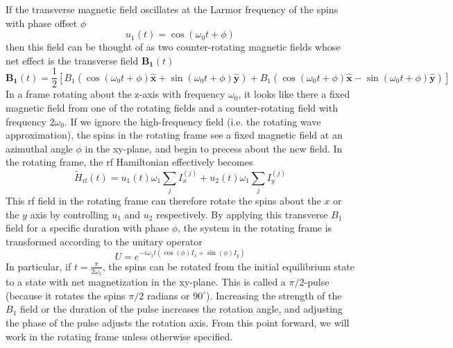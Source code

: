 If the transverse magnetic field oscillates at the Larmor frequency of the spins with phase offset $\phi$
\[
u_1(t) = \cos(\omega_0 t + \phi)
\]
then this field can be thought of as two counter-rotating magnetic fields whose net effect is the transverse field $\mathbf{B_1}(t)$
\[
\mathbf{B_1}(t) = \frac{1}{2} \left[
    B_1 (\cos(\omega_0 t + \phi) \mathbf{\hat{x}} + \sin(\omega_0 t + \phi) \mathbf{\hat{y}}) +
    B_1 (\cos(\omega_0 t + \phi) \mathbf{\hat{x}} - \sin(\omega_0 t + \phi) \mathbf{\hat{y}})
\right]
\]
%
%
In a frame rotating about the z-axis with frequency $\omega_0$, it looks like there a fixed magnetic field from one of the rotating fields and a counter-rotating field with frequency $2\omega_0$. If we ignore the high-frequency field (i.e. the rotating wave approximation), the spins in the rotating frame see a fixed magnetic field at an azimuthal angle $\phi$ in the xy-plane, and begin to precess about the new field.
In the rotating frame, the rf Hamiltonian effectively becomes
\begin{equation}\label{eq:nmr-ham-rf-rotating}
    \widetilde{H}_\text{rf}(t) = u_1(t) \omega_1 \sum_j I_x^{(j)} + u_2(t) \omega_1 \sum_j I_y^{(j)}
\end{equation}
This rf field in the rotating frame can therefore rotate the spins about the $x$ or the $y$ axis by controlling $u_1$ and $u_2$ respectively.
By applying this transverse $B_1$ field for a specific duration with phase $\phi$, the system in the rotating frame is transformed according to the unitary operator
\[
U = e^{-i \omega_1 t (\cos(\phi) I_x + \sin(\phi) I_y)}
\]
In particular, if $t = \frac{\pi}{2 \omega_1}$, the spins can be rotated from the initial equilibrium state to a state with net magnetization in the xy-plane. This is called a $\pi/2$-pulse (because it rotates the spins $\pi/2$ radians or $90^\circ$). Increasing the strength of the $B_1$ field or the duration of the pulse increases the rotation angle, and adjusting the phase of the pulse adjusts the rotation axis.
From this point forward, we will work in the rotating frame unless otherwise specified.

